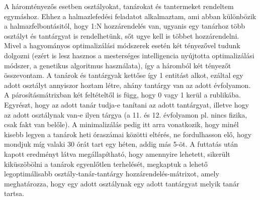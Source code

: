 \documentclass[a4paper,12pt]{article}
\begin{document}
A háromtényezős esetben osztályokat, tanárokat és tantermeket rendeltem egymáshoz. Ehhez a
halmazlefedési feladatot alkalmaztam, ami abban különbözik a halmazfelbontásitól, hogy
1:N hozzárendelés van, ugyanis egy tanárhoz több osztályt és tantárgyat is rendelhetünk, sőt
ugye kell is többet hozzárendelni. Mivel a hagyományos optimalizálási módszerek esetén két
tényezővel tudunk dolgozni (ezért is lesz hasznos a mesterséges intelligencia nyújtotta
optimalizálási módszer, a genetikus algoritmus használata), így a háromból két tényezőt
összevontam. A tanárok és tantárgyak kettőse így 1 entitást alkot, ezáltal egy adott osztályt
annyiszor hoztam létre, ahány tantárgy van az adott évfolyamon. A párosításmátrixban két
feltételtől is függ, hogy 0 vagy 1 kerül a rublikába. Egyrészt, hogy az adott tanár tudja-e
tanítani az adott tantárgyat, illetve hogy az adott osztálynak van-e ilyen tárgya (a 11. és
12. évfolyamon pl. nincs fizika, csak fakt van belőle). A minimalizálás pedig itt arra 
vonatkozik, hogy minél kisebb legyen a tanárok heti óraszámai közötti eltérés, ne fordulhasson
elő, hogy mondjuk míg valaki 30 órát tart egy héten, addig más 5-öt. A futtatás után kapott
eredményt látva megállapítható, hogy amennyire lehetett, sikerült kiküszöbölni a tanárok
egyenlőtlen terhelését, megkaptuk a lehető legoptimálisabb osztály-tanár-tantárgy
hozzárendelés-mátrixot, amely meghatározza, hogy egy adott osztálynak egy adott tantárgyat
melyik tanár tartsa. 



\end{document}
